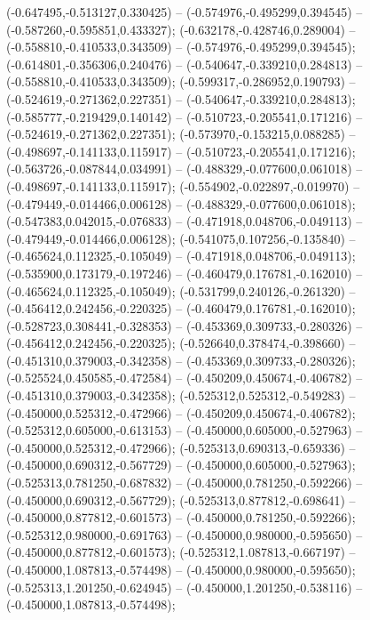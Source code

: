  (-0.647495,-0.513127,0.330425) -- (-0.574976,-0.495299,0.394545) -- (-0.587260,-0.595851,0.433327);
 (-0.632178,-0.428746,0.289004) -- (-0.558810,-0.410533,0.343509) -- (-0.574976,-0.495299,0.394545);
 (-0.614801,-0.356306,0.240476) -- (-0.540647,-0.339210,0.284813) -- (-0.558810,-0.410533,0.343509);
 (-0.599317,-0.286952,0.190793) -- (-0.524619,-0.271362,0.227351) -- (-0.540647,-0.339210,0.284813);
 (-0.585777,-0.219429,0.140142) -- (-0.510723,-0.205541,0.171216) -- (-0.524619,-0.271362,0.227351);
 (-0.573970,-0.153215,0.088285) -- (-0.498697,-0.141133,0.115917) -- (-0.510723,-0.205541,0.171216);
 (-0.563726,-0.087844,0.034991) -- (-0.488329,-0.077600,0.061018) -- (-0.498697,-0.141133,0.115917);
 (-0.554902,-0.022897,-0.019970) -- (-0.479449,-0.014466,0.006128) -- (-0.488329,-0.077600,0.061018);
 (-0.547383,0.042015,-0.076833) -- (-0.471918,0.048706,-0.049113) -- (-0.479449,-0.014466,0.006128);
 (-0.541075,0.107256,-0.135840) -- (-0.465624,0.112325,-0.105049) -- (-0.471918,0.048706,-0.049113);
 (-0.535900,0.173179,-0.197246) -- (-0.460479,0.176781,-0.162010) -- (-0.465624,0.112325,-0.105049);
 (-0.531799,0.240126,-0.261320) -- (-0.456412,0.242456,-0.220325) -- (-0.460479,0.176781,-0.162010);
 (-0.528723,0.308441,-0.328353) -- (-0.453369,0.309733,-0.280326) -- (-0.456412,0.242456,-0.220325);
 (-0.526640,0.378474,-0.398660) -- (-0.451310,0.379003,-0.342358) -- (-0.453369,0.309733,-0.280326);
 (-0.525524,0.450585,-0.472584) -- (-0.450209,0.450674,-0.406782) -- (-0.451310,0.379003,-0.342358);
 (-0.525312,0.525312,-0.549283) -- (-0.450000,0.525312,-0.472966) -- (-0.450209,0.450674,-0.406782);
 (-0.525312,0.605000,-0.613153) -- (-0.450000,0.605000,-0.527963) -- (-0.450000,0.525312,-0.472966);
 (-0.525313,0.690313,-0.659336) -- (-0.450000,0.690312,-0.567729) -- (-0.450000,0.605000,-0.527963);
 (-0.525313,0.781250,-0.687832) -- (-0.450000,0.781250,-0.592266) -- (-0.450000,0.690312,-0.567729);
 (-0.525313,0.877812,-0.698641) -- (-0.450000,0.877812,-0.601573) -- (-0.450000,0.781250,-0.592266);
 (-0.525312,0.980000,-0.691763) -- (-0.450000,0.980000,-0.595650) -- (-0.450000,0.877812,-0.601573);
 (-0.525312,1.087813,-0.667197) -- (-0.450000,1.087813,-0.574498) -- (-0.450000,0.980000,-0.595650);
 (-0.525313,1.201250,-0.624945) -- (-0.450000,1.201250,-0.538116) -- (-0.450000,1.087813,-0.574498);
